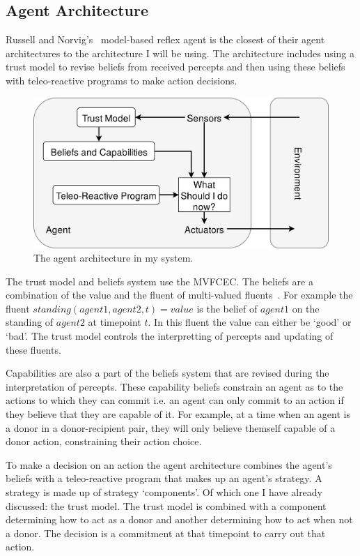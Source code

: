 \documentclass[]{final_report}
\begin{document}
\subsection{Agent Architecture}
Russell and Norvig's~\cite{russell2016artificial} model-based reflex agent is the closest of their agent architectures to the architecture I will be using. The architecture includes using a trust model to revise beliefs from received percepts and then using these beliefs with teleo-reactive programs to make action decisions.\par 
\begin{figure}
	\vspace{-30pt}
	\begin{framed}
	\begin{center}
	\includegraphics[width=\textwidth]{AgentArchitecture.png}
	\caption{The agent architecture in my system.}
	\label{fig:model_reflex}
	\end{center}
	\end{framed}
	\vspace{-30pt}
\end{figure}
The trust model and beliefs system use the MVFCEC. The beliefs are a combination of the value and the fluent of multi-valued fluents~\cite{artikis2009specifying}. For example the fluent $standing(agent1, agent2, t)=value$ is the belief of $agent1$ on the standing of $agent2$ at timepoint $t$. In this fluent the value can either be `good' or `bad'. The trust model controls the interpretting of percepts and updating of these fluents.\par
Capabilities are also a part of the beliefs system that are revised during the interpretation of percepts. These capability beliefs constrain an agent as to the actions to which they can commit i.e. an agent can only commit to an action if they believe that they are capable of it. For example, at a time when an agent is a donor in a donor-recipient pair, they will only believe themself capable of a donor action, constraining their action choice.\par 
To make a decision on an action the agent architecture combines the agent's beliefs with a teleo-reactive program that makes up an agent's strategy. A strategy is made up of strategy `components'. Of which one I have already discussed: the trust model. The trust model is combined with a component determining how to act as a donor and another determining how to act when not a donor. The decision is a commitment at that timepoint to carry out that action.
\end{document}
